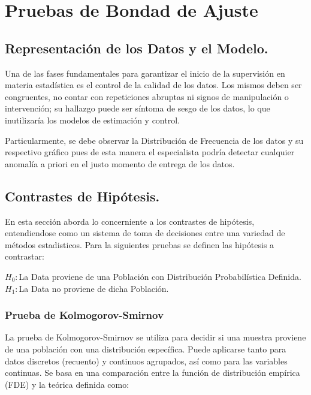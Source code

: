\documentclass[10pt,]{article}
\begin{document}
\hypertarget{pruebas-de-bondad-de-ajuste}{%
\section{Pruebas de Bondad de
Ajuste}\label{pruebas-de-bondad-de-ajuste}}

\hypertarget{representacion-de-los-datos-y-el-modelo.}{%
\subsection{Representación de los Datos y el
Modelo.}\label{representacion-de-los-datos-y-el-modelo.}}

Una de las fases fundamentales para garantizar el inicio de la
supervisión en materia estadística es el control de la calidad de los
datos. Los mismos deben ser congruentes, no contar con repeticiones
abruptas ni signos de manipulación o intervención; su hallazgo puede ser
síntoma de sesgo de los datos, lo que inutilizaría los modelos de
estimación y control.

Particularmente, se debe observar la Distribución de Frecuencia de los
datos y su respectivo gráfico pues de esta manera el especialista podría
detectar cualquier anomalía a priori en el justo momento de entrega de
los datos.

\hypertarget{contrastes-de-hipotesis.}{%
\subsection{Contrastes de Hipótesis.}\label{contrastes-de-hipotesis.}}

En esta sección aborda lo concerniente a los contrastes de hipótesis,
entendiendose como un sistema de toma de decisiones entre una variedad
de métodos estadisticos. Para la siguientes pruebas se definen las
hipótesis a contrastar:

\(H_0:\)La Data proviene de una Población con Distribución
Probabilística Definida.\\
\(H_1:\)La Data no proviene de dicha Población.

\hypertarget{prueba-de-kolmogorov-smirnov}{%
\subsubsection{Prueba de
Kolmogorov-Smirnov}\label{prueba-de-kolmogorov-smirnov}}

La prueba de Kolmogorov-Smirnov se utiliza para decidir si una muestra
proviene de una población con una distribución específica. Puede
aplicarse tanto para datos discretos (recuento) y continuos agrupados,
así como para las variables continuas. Se basa en una comparación entre
la función de distribución empírica (FDE) y la teórica definida como:
\end{document}
